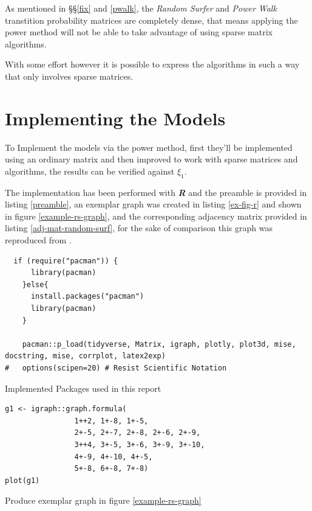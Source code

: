 \documentclass[11pt]{article}
\begin{document}
As mentioned in \S\S \ref{fix} and \ref{pwalk}, the \emph{Random Surfer} and \emph{Power Walk}
transtition probability matrices are completely dense, that means applying the
power method will not be able to take advantage of using sparse matrix
algorithms.

With some effort however it is possible to express the algorithms in such a way that only involves sparse matrices.

\section{Implementing the Models}
\label{implement_models}
To Implement the models via the power method, first they'll be implemented using
an ordinary matrix and then improved to work with sparse matrices and
algorithms, the results can be verified against \(\xi_{1}\).

The implementation has been performed with \emph{\textbf{R}} and the preamble is
provided in listing \ref{preamble}, an exemplar graph was created in listing \ref{ex-fig-r} and shown in figure \ref{example-rs-graph}, and the corresponding adjacency matrix provided in listing \ref{adj-mat-random-surf}, for the sake of comparison this graph was reproduced from \cite{parkPowerWalkRevisiting2013}.




\begin{listing}[htbp]
\begin{verbatim}
  if (require("pacman")) {
      library(pacman)
    }else{
      install.packages("pacman")
      library(pacman)
    }

    pacman::p_load(tidyverse, Matrix, igraph, plotly, plot3d, mise, docstring, mise, corrplot, latex2exp)
#   options(scipen=20) # Resist Scientific Notation
\end{verbatim}
\caption{\label{preamble}Implemented Packages used in this report}
\end{listing}


\begin{listing}[htbp]
\begin{verbatim}
g1 <- igraph::graph.formula(
                1++2, 1+-8, 1+-5,
                2+-5, 2+-7, 2+-8, 2+-6, 2+-9,
                3++4, 3+-5, 3+-6, 3+-9, 3+-10,
                4+-9, 4+-10, 4+-5,
                5+-8, 6+-8, 7+-8)
plot(g1)
\end{verbatim}
\caption{\label{ex-fig-r}Produce exemplar graph in figure \ref{example-rs-graph}}
\end{listing}
\end{document}
